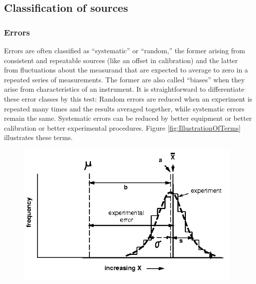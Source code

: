 \documentclass[12pt,twoside,english]{article}\usepackage[]{graphicx}\usepackage[]{color}
\let\OrgIndex\index
\renewcommand*{\index}[1]{\OrgIndex{#1}}
\begin{document}
{{\begin{appendices}
\subsection{Classification of sources}
\subsubsection{Errors}

\label{sec:Classification-of-sources}Errors are often classified as ``systematic'' or ``random,'' the former arising from consistent and repeatable sources (like an offset in calibration) and the latter from fluctuations about the measurand that are expected to average to zero in a repeated series of measurements. The former are also called ``biases'' when they arise from characteristics of an instrument. It is straightforward to differentiate these error classes by this test: Random errors are reduced when an experiment is repeated many times and the results averaged together, while systematic errors remain the same. Systematic errors can be reduced by better equipment or better calibration or better experimental procedures. Figure \ref{fig:IllustrationOfTerms} illustrates these terms. 

\begin{figure}[H] 
\noindent \begin{centering}
\includegraphics[width=11cm]{SpecialGraphics/A-figure1.png}  
\par\end{centering}


\end{figure}
\end{appendices}}}
\end{document}
